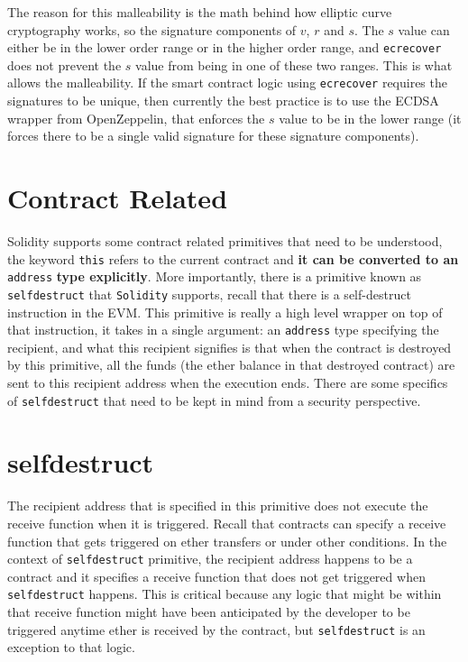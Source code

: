 The reason for this malleability is the math behind how elliptic curve cryptography works, so the signature components of $v$, $r$ and $s$. The $s$ value can either be in the lower order range or in the higher order range, and \texttt{ecrecover} does not prevent the $s$ value from being in one of these two ranges. This is what allows the malleability. If the smart contract logic using \texttt{ecrecover} requires the signatures to be unique, then currently the best practice is to use the ECDSA wrapper from OpenZeppelin, that enforces the $s$ value to be in the lower range (it forces there to be a single valid signature for these signature components).


\section{Contract Related}
Solidity supports some contract related primitives that need to be understood, the keyword \texttt{this} refers to the current contract and \textbf{it can be converted to an} \texttt{address} \textbf{type explicitly}. More importantly, there is a primitive known as \texttt{selfdestruct} that \texttt{Solidity} supports, recall that there is a self-destruct instruction in the EVM. This primitive is really a high level wrapper on top of that instruction, it takes in a single argument: an \texttt{address} type specifying the recipient, and what this recipient signifies is that when the contract is destroyed by this primitive, all the funds (the ether balance in that destroyed contract) are sent to this recipient address when the execution ends. There are some specifics of \texttt{selfdestruct} that need to be kept in mind from a security perspective.

\section{selfdestruct}
The recipient address that is specified in this primitive does not execute the receive function when it is triggered. Recall that contracts can specify a receive function that gets triggered on ether transfers or under other conditions. In the context of \texttt{selfdestruct} primitive, the recipient address happens to be a contract and it specifies a receive function that does not get triggered when \texttt{selfdestruct} happens. This is critical because any logic that might be within that receive function might have been anticipated by the developer to be triggered anytime ether is received by the contract, but \texttt{selfdestruct} is an exception to that logic.\\

